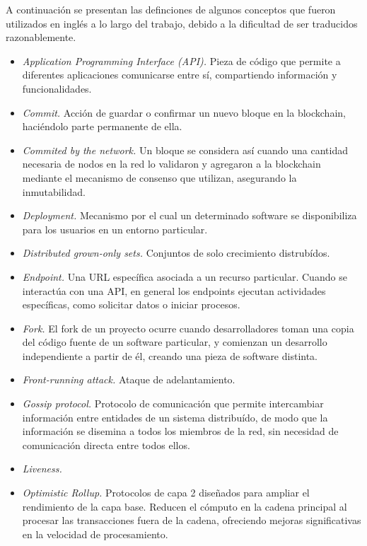 A continuación se presentan las definciones de algunos conceptos que fueron utilizados
en inglés a lo largo del trabajo, debido a la dificultad de ser traducidos razonablemente.
\begin{itemize}
     \item \textit{Application Programming Interface (API).}  Pieza de código que permite a diferentes
     aplicaciones comunicarse entre sí, compartiendo información y funcionalidades.
     \item \textit{Commit.} Acción de guardar o confirmar un nuevo bloque en la
     blockchain, haciéndolo parte permanente de ella.
     \item \textit{Commited by the network.} Un bloque se considera así cuando una cantidad necesaria de nodos
     en la red lo validaron y agregaron a la blockchain mediante el mecanismo de consenso que utilizan,
     asegurando la inmutabilidad. 
     \item \textit{Deployment.} Mecanismo por el cual un determinado software se disponibiliza para los usuarios
     en un entorno particular.
     \item \textit{Distributed grown-only sets.} Conjuntos de solo crecimiento distrubídos.
     \item \textit{Endpoint.} Una URL específica asociada a un recurso particular. Cuando se interactúa con una API,
     en general los endpoints ejecutan actividades específicas, como solicitar datos o iniciar procesos.
     \item \textit{Fork.} El fork de un proyecto ocurre cuando desarrolladores toman una copia del código fuente de
     un software particular, y comienzan un desarrollo independiente a partir de él, creando una pieza de software
     distinta.
     \item \textit{Front-running attack.} Ataque de adelantamiento.
     \item \textit{Gossip protocol.} Protocolo de comunicación que permite intercambiar información
     entre entidades de un sistema distribuído, de modo que la información se disemina a todos los miembros de la red,
     sin necesidad de comunicación directa entre todos ellos.
     \item \textit{Liveness.}
     \item \textit{Optimistic Rollup.} Protocolos de capa 2 diseñados para ampliar el rendimiento de la capa base.
     Reducen el cómputo en la cadena principal al procesar las transacciones fuera de la cadena, ofreciendo mejoras
     significativas en la velocidad de procesamiento.

\end{itemize}

